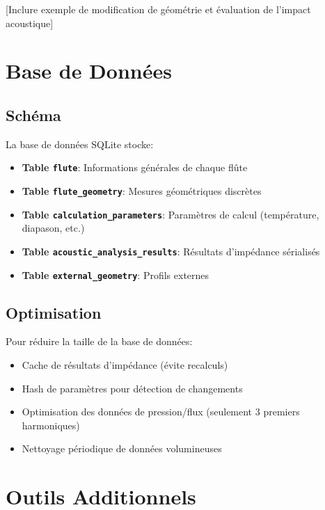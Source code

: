 \documentclass[12pt,a4paper,twocolumn]{article}
\begin{document}
[Inclure exemple de modification de géométrie et évaluation de l'impact acoustique]

\section{Base de Données}

\subsection{Schéma}

La base de données SQLite stocke:

\begin{itemize}
    \item \textbf{Table \texttt{flute}}: Informations générales de chaque flûte
    \item \textbf{Table \texttt{flute\_geometry}}: Mesures géométriques discrètes
    \item \textbf{Table \texttt{calculation\_parameters}}: Paramètres de calcul (température, diapason, etc.)
    \item \textbf{Table \texttt{acoustic\_analysis\_results}}: Résultats d'impédance sérialisés
    \item \textbf{Table \texttt{external\_geometry}}: Profils externes
\end{itemize}

\subsection{Optimisation}

Pour réduire la taille de la base de données:

\begin{itemize}
    \item Cache de résultats d'impédance (évite recalculs)
    \item Hash de paramètres pour détection de changements
    \item Optimisation des données de pression/flux (seulement 3 premiers harmoniques)
    \item Nettoyage périodique de données volumineuses
\end{itemize}

\section{Outils Additionnels}
\end{document}

